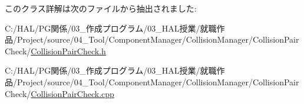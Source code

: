 このクラス詳解は次のファイルから抽出されました\+:\begin{DoxyCompactItemize}
\item 
C\+:/\+H\+A\+L/\+P\+G関係/03\+\_\+作成プログラム/03\+\_\+\+H\+A\+L授業/就職作品/\+Project/source/04\+\_\+\+Tool/\+Component\+Manager/\+Collision\+Manager/\+Collision\+Pair\+Check/\mbox{\hyperlink{_collision_pair_check_8h}{Collision\+Pair\+Check.\+h}}\item 
C\+:/\+H\+A\+L/\+P\+G関係/03\+\_\+作成プログラム/03\+\_\+\+H\+A\+L授業/就職作品/\+Project/source/04\+\_\+\+Tool/\+Component\+Manager/\+Collision\+Manager/\+Collision\+Pair\+Check/\mbox{\hyperlink{_collision_pair_check_8cpp}{Collision\+Pair\+Check.\+cpp}}\end{DoxyCompactItemize}
